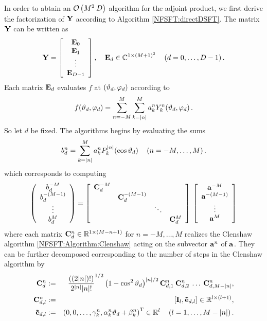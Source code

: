In order to abtain an $\mathcal{O}\left(M^2 \: D\right)$ algorithm for the adjoint product, we first derive the factorization of $\mathbf{Y}$ according to Algorithm \ref{NFSFT:directDSFT}. The matrix $\mathbf{Y}$ can be written as
$$
  \mathbf{Y} = 
    \left[\begin{array}{c}
      \mathbf{E}_{0}\\
      \mathbf{E}_{1}\\
      \vdots\\
      \mathbf{E}_{D-1}
    \end{array}\right], \quad \mathbf{E}_{d} \in \mathbb{C}^{1 \times (M+1)^2} \quad \left(d=0,\ldots,D-1\right).
$$
Each matrix $\mathbf{E}_{d}$ evaluates $f$ at $\left(\vartheta_{d},\varphi_{d}\right)$ according to 
$$
  f{\hspace{-0.4ex}}\left(\vartheta_{d},\varphi_{d}\right) = \sum_{n=-M}^M \sum_{k=\left\vert n\right\vert}^M a_k^n Y_{k}^n{\hspace{-0.4ex}}\left(\vartheta_{d},\varphi_{d}\right).
$$
So let $d$ be fixed. The algorithms begins by evaluating the sums
$$
  b^{n}_{d} = \sum_{k=\left\vert n\right\vert}^M a_{k}^n P_{k}^{\left\vert n\right\vert}{\hspace{-0.4ex}}\left(\cos\vartheta_{d}\right) \quad \left(n=-M,\ldots,M\right). 
$$
which corresponds to computing
$$
  \left(\begin{array}{c}
    b^{-M}_{d}\\
    b^{-(M-1)}_{d}\\
    \vdots\\
    b^{M}_{d}
  \end{array}\right)
  =
  \left[\begin{array}{cccc}
    \mathbf{C}^{-M}_{d} &                    &        &               \\
                   & \mathbf{C}^{-(M-1)}_{d} &        &               \\
                   &                    & \ddots &               \\
                   &                    &        & \mathbf{C}^{M}_{d} 
  \end{array}\right]
  \:
  \left[\begin{array}{c}
    \mathbf{a}^{-M}\\
    \mathbf{a}^{-(M-1)}\\
    \vdots\\
    \mathbf{a}^{M}
  \end{array}\right]
$$
where each matrix $\mathbf{C}^{n}_{d} \in \mathbb{R}^{1 \times (M-n+1)}$ for $n = -M,\ldots,M$ realizes the Clenshaw algorithm \ref{NFSFT:Algorithm:Clenshaw} acting on the subvector $\mathbf{a}^n$ of $\mathbf{a}$.
They can be further decomposed corresponding to the number of steps in the Clenshaw algorithm by
\begin{eqnarray*}
  \mathbf{C}^{n}_{d}       & := & \frac{((2|n|)!)}{2^{|n|} |n|!}^{1/2} \left(1-\cos^2\vartheta_{d}\right)^{|n|/2} \mathbf{C}_{d,1}^{n} \: \mathbf{C}_{d,2}^{n} \: \ldots \: \mathbf{C}_{d,M-\left\vert n\right\vert}^{n},\\
  \mathbf{C}_{d,l}^{n}     & := & \left[\mathbf{I}_{l}, \mathbf{\tilde{e}}_{d,l}\right] \in \mathbb{R}^{l \times (l+1)},\\
  \mathbf{\tilde{e}}_{d,l} & := & \left(0,0,\ldots,\gamma_{k}^n,\alpha_{k}^n \vartheta_{d} + \beta_{k}^n\right)^{\text{\rm{T}}} \in \mathbb{R}^{l} \quad \left(l=1,\ldots,M-\left\vert n\right\vert\right).
\end{eqnarray*}
